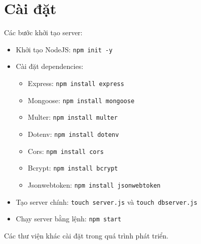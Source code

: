     \section{Cài đặt}
        \hspace*{0.6cm}Các bước khởi tạo server:
        \begin{itemize}
            \item Khởi tạo NodeJS: \texttt{npm init -y}
            \item Cài đặt dependencies:
            \begin{itemize}
                \item Express: \texttt{npm install express}
                \item Mongoose: \texttt{npm install mongoose}
                \item Multer: \texttt{npm install multer}
                \item Dotenv: \texttt{npm install dotenv}
                \item Cors: \texttt{npm install cors}
                \item Bcrypt: \texttt{npm install bcrypt}
                \item Jsonwebtoken: \texttt{npm install jsonwebtoken}
            \end{itemize}
            \item Tạo server chính: \texttt{touch server.js} và \texttt{touch dbserver.js}
            \item Chạy server bằng lệnh: \texttt{npm start} 
        \end{itemize}
        \hspace*{0.6cm}Các thư viện khác cài đặt trong quá trình phát triển.